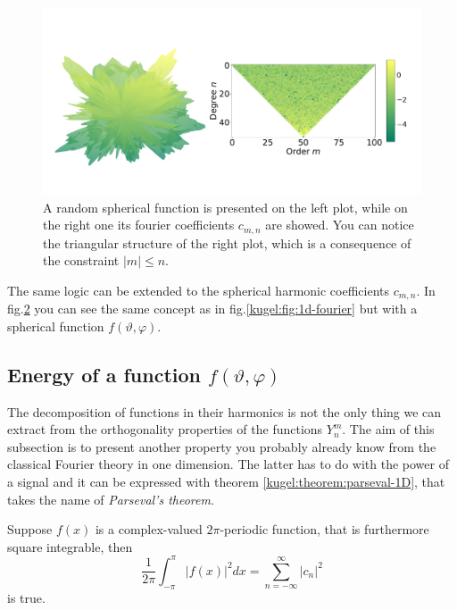 \begin{figure}
  \centering
  \includegraphics[width=.95\textwidth]{papers/kugel/figures/python/sph-fourier.pdf}
  \caption{A random spherical function is presented on the left plot, while on the right one its fourier coefficients $c_{m,n}$ are showed. You can notice the triangular structure of the right plot, 
  which is a consequence of the constraint $|m|\leq n$.}
  \label{kugel:fig:sph-fourier}
\end{figure}

\begin{figure}
  \centering
  \caption{}
  \label{kugel:fig:fourier-on-sphere-increasing-index}
\end{figure}

The same logic can be extended to the spherical harmonic coefficients $c_{m,n}$. In fig.\ref{kugel:fig:fourier-on-sphere-increasing-index} you can see the same concept as in fig.\ref{kugel:fig:1d-fourier} 
but with a spherical function $f(\vartheta, \varphi)$.

\subsection{Energy of a function $f(\vartheta, \varphi)$}

The decomposition of functions in their harmonics is not the only thing we can extract from the orthogonality properties of the functions $Y^m_n$. 
The aim of this subsection is to present another property you probably already know from the classical Fourier theory in one dimension. 
The latter has to do with the power of a signal and it can be expressed with theorem \ref{kugel:theorem:parseval-1D}, that takes the name of \emph{Parseval's theorem}.

\begin{theorem}
  \label{kugel:theorem:parseval-1D}
  Suppose $f(x)$ is a complex-valued $2\pi$-periodic function, that is furthermore square integrable, then
  \begin{equation*}
    \frac{1}{2\pi}\int_{-\pi}^{\pi} |f(x)|^2dx = \sum_{n=-\infty}^\infty |c_n|^2
  \end{equation*}
  is true.
\end{theorem}

